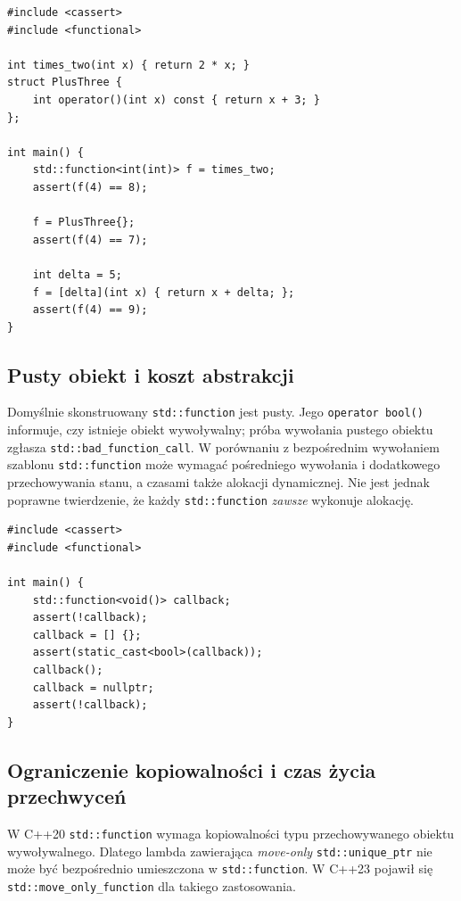 \begin{lstlisting}[caption={Jeden typ std::function dla różnych obiektów wywoływalnych; kompletny program.}]
#include <cassert>
#include <functional>

int times_two(int x) { return 2 * x; }
struct PlusThree {
    int operator()(int x) const { return x + 3; }
};

int main() {
    std::function<int(int)> f = times_two;
    assert(f(4) == 8);

    f = PlusThree{};
    assert(f(4) == 7);

    int delta = 5;
    f = [delta](int x) { return x + delta; };
    assert(f(4) == 9);
}
\end{lstlisting}

\subsection{Pusty obiekt i koszt abstrakcji}

Domyślnie skonstruowany \texttt{std::function} jest pusty. Jego
\texttt{operator bool()} informuje, czy istnieje obiekt wywoływalny;
próba wywołania pustego obiektu zgłasza \texttt{std::bad\_function\_call}.
W porównaniu z bezpośrednim wywołaniem szablonu \texttt{std::function}
może wymagać pośredniego wywołania i dodatkowego przechowywania stanu,
a czasami także alokacji dynamicznej. Nie jest jednak poprawne twierdzenie,
że każdy \texttt{std::function} \emph{zawsze} wykonuje alokację.

\begin{lstlisting}[caption={Pusty std::function i jawne sprawdzanie; kompletny program.}]
#include <cassert>
#include <functional>

int main() {
    std::function<void()> callback;
    assert(!callback);
    callback = [] {};
    assert(static_cast<bool>(callback));
    callback();
    callback = nullptr;
    assert(!callback);
}
\end{lstlisting}

\subsection{Ograniczenie kopiowalności i czas życia przechwyceń}

W C++20 \texttt{std::function} wymaga kopiowalności typu przechowywanego
obiektu wywoływalnego. Dlatego lambda zawierająca \emph{move-only}
\texttt{std::unique\_ptr} nie może być bezpośrednio umieszczona w
\texttt{std::function}. W C++23 pojawił się
\texttt{std::move\_only\_function} dla takiego zastosowania.

